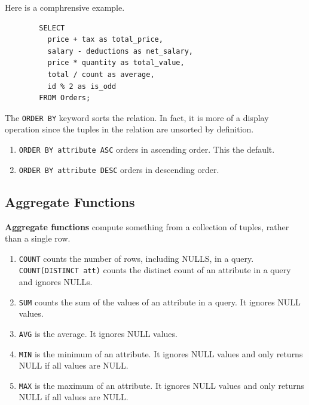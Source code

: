 \documentclass{article}
\begin{document}
    \begin{example}[Arithmetic]
      Here is a comphrensive example. 
      \begin{lstlisting}
        SELECT 
          price + tax as total_price,
          salary - deductions as net_salary,
          price * quantity as total_value,
          total / count as average,
          id % 2 as is_odd
        FROM Orders; 
      \end{lstlisting}
    \end{example}

    \begin{definition}[Sorting]
      The \texttt{ORDER BY} keyword sorts the relation. In fact, it is more of a display operation since the tuples in the relation are unsorted by definition. 
      \begin{enumerate}
        \item \texttt{ORDER BY attribute ASC} orders in ascending order. This the default. 
        \item \texttt{ORDER BY attribute DESC} orders in descending order.
      \end{enumerate}
    \end{definition}

  \subsection{Aggregate Functions} 

      \begin{definition} 
        \textbf{Aggregate functions} compute something from a collection of tuples, rather than a single row. 
        \begin{enumerate}
          \item \texttt{COUNT} counts the number of rows, including NULLS, in a query. \texttt{COUNT(DISTINCT att)} counts the distinct count of an attribute in a query and ignores NULLs. 
          \item \texttt{SUM} counts the sum of the values of an attribute in a query. It ignores NULL values. 
          \item \texttt{AVG} is the average. It ignores NULL values. 
          \item \texttt{MIN} is the minimum of an attribute. It ignores NULL values and only returns NULL if all values are NULL. 
          \item \texttt{MAX} is the maximum of an attribute. It ignores NULL values and only returns NULL if all values are NULL. 
        \end{enumerate}
      \end{definition}
\end{document}
